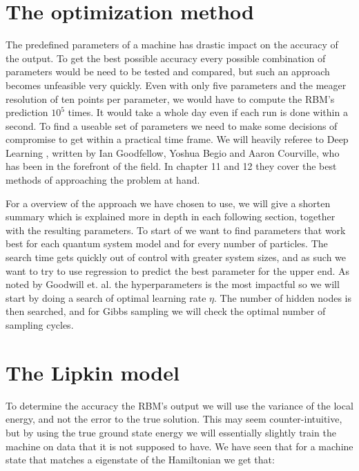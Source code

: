 \section{The optimization method}

The predefined parameters of a machine has drastic impact on the accuracy of the output. To get the best possible accuracy every possible combination of parameters would be need to be tested and compared, but such an approach becomes unfeasible very quickly. Even with only five parameters and the meager resolution of ten points per parameter, we would have to compute the RBM's prediction $10^5$ times. It would take a whole day even if each run is done within a second. To find a useable set of parameters we need to make some decisions of compromise to get within a practical time frame. We will heavily referee to Deep Learning \cite{Goodfellow}, written by Ian Goodfellow, Yoshua Begio and Aaron Courville, who has been in the forefront of the field. In chapter 11 and 12 they cover the best methods of approaching the problem at hand.

\vspace{\baselineskip}
For a overview of the approach we have chosen to use, we will give a shorten summary which is explained more in depth in each following section, together with the resulting parameters. To start of we want to find parameters that work best for each quantum system model and for every number of particles. The search time gets quickly out of control with greater system sizes, and as such we want to try to use regression to predict the best parameter for the upper end. As noted by Goodwill et. al. the hyperparameters is the most impactful so we will start by doing a search of optimal learning rate $\eta$. The number of hidden nodes is then searched, and for Gibbs sampling we will check the optimal number of sampling cycles.

\section{The Lipkin model}\label{sec:opt_lipkin}
\def \optgridwidhtratio {0.8}
\def \eat {\eta}
To determine the accuracy the RBM's output we will use the variance of the local energy, and not the error to the true solution. This may seem counter-intuitive, but by using the true ground state energy we will essentially slightly train the machine on data that it is not supposed to have. We have seen that for a machine state that matches a eigenstate of the Hamiltonian we get that:

